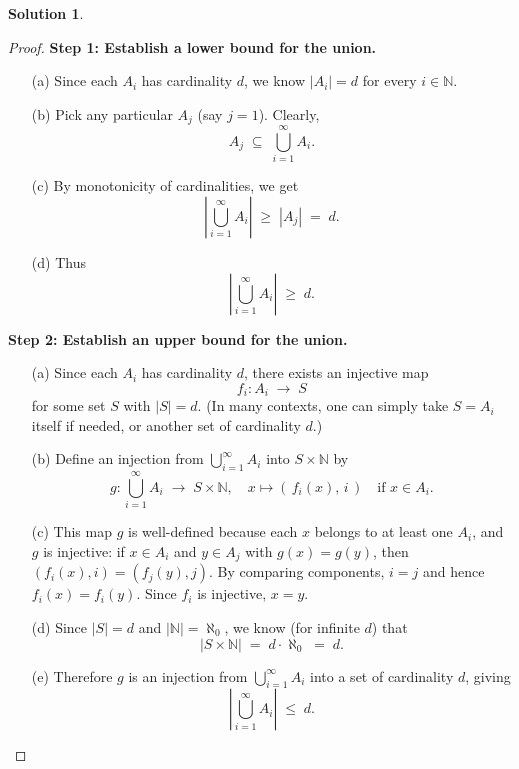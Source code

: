 \documentclass[12pt]{article}
\theoremstyle{definition} %
\newtheorem{solution}{Solution}
\theoremstyle{plain} %
\begin{document}
\begin{solution}
        
        \begin{proof}
        \textbf{Step 1: Establish a lower bound for the union.}
        \begin{enumerate}
            \item[(a)] Since each $A_i$ has cardinality $d$, we know $|A_i| = d$ for every $i \in \mathbb{N}$.
            \item[(b)] Pick any particular $A_j$ (say $j=1$). Clearly,
            \[
               A_j \;\subseteq\; \bigcup_{i=1}^\infty A_i.
            \]
            \item[(c)] By monotonicity of cardinalities, we get
            \[
               \left|\bigcup_{i=1}^\infty A_i\right|
               \;\ge\;
               |A_j|
               \;=\;
               d.
            \]
            \item[(d)] Thus
            \[
               \left|\bigcup_{i=1}^\infty A_i\right|
               \;\ge\;
               d.
            \]
        \end{enumerate}
        
        \vspace{0.3cm}
        \textbf{Step 2: Establish an upper bound for the union.}
        \begin{enumerate}
            \item[(a)] Since each $A_i$ has cardinality $d$, there exists an injective map 
            \[
               f_i: A_i \;\longrightarrow\; S
            \]
            for some set $S$ with $|S| = d$. (In many contexts, one can simply take $S = A_i$ itself if needed, or another set of cardinality $d$.)
            \item[(b)] Define an injection from $\bigcup_{i=1}^\infty A_i$ into $S \times \mathbb{N}$ by
            \[
               g: \bigcup_{i=1}^\infty A_i \;\longrightarrow\; S \times \mathbb{N}, \quad
               x \mapsto (\,f_i(x),\, i\,) \quad \text{if } x \in A_i.
            \]
            \item[(c)] This map $g$ is well-defined because each $x$ belongs to at least one $A_i$, and $g$ is injective: if $x \in A_i$ and $y \in A_j$ with $g(x) = g(y)$, then $(f_i(x), i) = (f_j(y), j)$. By comparing components, $i=j$ and hence $f_i(x) = f_i(y)$. Since $f_i$ is injective, $x = y$.
            \item[(d)] Since $|S| = d$ and $|\mathbb{N}| = \aleph_0$, we know (for infinite $d$) that
            \[
               |S \times \mathbb{N}|
               \;=\;
               d \cdot \aleph_0
               \;=\;
               d.
            \]
            \item[(e)] Therefore $g$ is an injection from $\bigcup_{i=1}^\infty A_i$ into a set of cardinality $d$, giving
            \[
               \left|\bigcup_{i=1}^\infty A_i\right|
               \;\le\;
               d.
            \]
        \end{enumerate}
        

\end{proof}
\end{solution}
\end{document}
